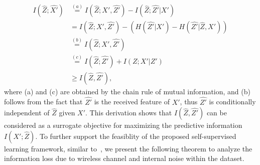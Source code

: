 \begin{equation}
    \begin{aligned}
        I(\hat{Z};\hat{X'})&\overset{(a)}{=}I(\hat{Z};X',\hat{Z'}) - I(\hat{Z};\hat{Z'}|X')\\
        &= I(\hat{Z};X',\hat{Z'})- (H(\hat{Z'}|X')-H(\hat{Z'}|\hat{Z},X'))\\
        &\overset{(b)}{=} I(\hat{Z};X',\hat{Z'})\\
        &\overset{(c)}{=} I(\hat{Z};\hat{Z'}) + I(Z;X'|Z')\\
        &\geq I(\hat{Z},\hat{Z'}),
    \end{aligned}
\end{equation}
where (a) and (c) are obtained by the chain rule of mutual information, and (b) follows from the fact that $\hat{Z'}$ is the received feature of $X'$, thus $\hat{Z'}$ is conditionally independent of $\hat{Z}$ given $X'$. This derivation shows that $I(\hat{Z},\hat{Z'})$ can be considered as a surrogate objective for maximizing the predictive information $I(X';\hat{Z})$. 
To further support the feasiblity of the proposed self-supervised learning framework, similar to~\cite{tsai2020self}, we present the following theorem to analyze the information loss due to wireless channel and internal noise within the dataset.



